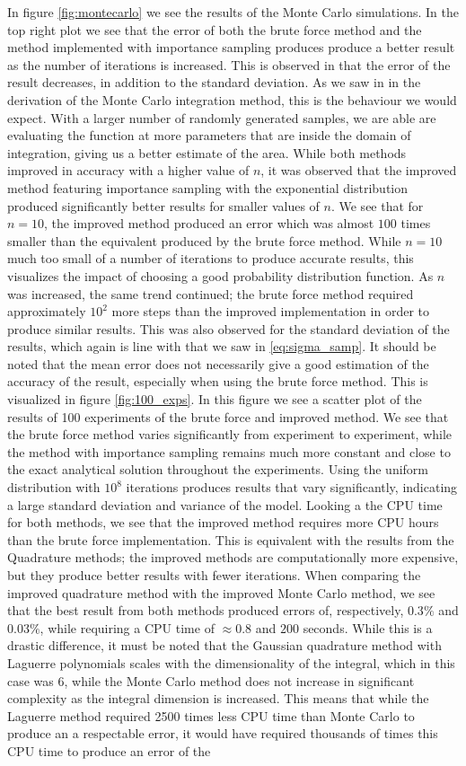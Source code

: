 \documentclass[a4paper,10pt,english]{article}
\begin{document}
In figure \ref{fig:montecarlo} we see the results of the Monte Carlo simulations. In the top right plot we see that the error of both the brute force method and the method implemented with importance sampling produces produce a better result as the number of iterations is increased. This is observed in that the error of the result decreases, in addition to the standard deviation. As we saw in in the derivation of the Monte Carlo integration method, this is the behaviour we would expect. With a larger number of randomly generated samples, we are able are evaluating the function at more parameters that are inside the domain of integration, giving us a better estimate of the area. While both methods improved in accuracy with a higher value of $n$, it was observed that the improved method featuring importance sampling with the exponential distribution produced significantly better results for smaller values of $n$. We see that for $n=10$, the improved method produced an error which was almost $100$ times smaller than the equivalent produced by the brute force method. While $n=10$ much too small of a number of iterations to produce accurate results, this visualizes the impact of choosing a good probability distribution function. As $n$ was increased, the same trend continued; the brute force method required approximately $10^2$ more steps than the improved implementation in order to produce similar results. This was also observed for the standard deviation of the results, which again is line with that we saw in \ref{eq:sigma_samp}. It should be noted that the mean error does not necessarily give a good estimation of the accuracy of the result, especially when using the brute force method. This is visualized in figure \ref{fig:100_exps}. In this figure we see a scatter plot of the results of 100 experiments of the brute force and improved method. We see that the brute force method varies significantly from experiment to experiment, while the method with importance sampling remains much more constant and close to the exact analytical solution throughout the experiments. Using the uniform distribution with $10^8$ iterations produces results that vary significantly, indicating a large standard deviation and variance of the model. Looking a the CPU time for both methods, we see that the improved method requires more CPU hours than the brute force implementation. This is equivalent with the results from the Quadrature methods; the improved methods are computationally more expensive, but they produce better results with fewer iterations. When comparing the improved quadrature method with the improved Monte Carlo method, we see that the best result from both methods produced errors of, respectively, $0.3 \%$ and $0.03\%$, while requiring a CPU time of $\approx 0.8$ and $200$ seconds. While this is a drastic difference, it must be noted that the Gaussian quadrature method with Laguerre polynomials scales with the dimensionality of the integral, which in this case was 6, while the Monte Carlo method does not increase in significant complexity as the integral dimension is increased. This means that while the Laguerre method required 2500 times less CPU time than Monte Carlo to produce an a respectable error, it would have required thousands of times this CPU time to produce an error of the 
\end{document}
